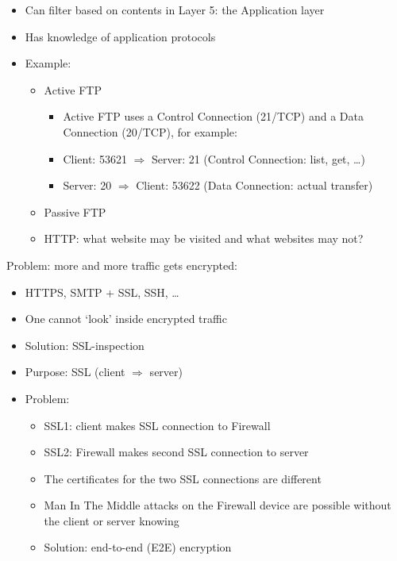 \documentclass{article}
\begin{document}
\begin{itemize}
    \item Can filter based on contents in Layer 5: the Application layer
    \item Has knowledge of application protocols
    \item Example:
    \begin{itemize}
        \item Active FTP
        \begin{itemize}
            \item Active FTP uses a Control Connection (21/TCP) and a Data Connection (20/TCP), for example:
            \item Client: 53621 $\Rightarrow$ Server: 21 (Control Connection: list, get, \dots)
            \item Server: 20 $\Rightarrow$ Client: 53622 (Data Connection: actual transfer)
        \end{itemize}
        \item Passive FTP
        \item HTTP: what website may be visited and what websites may not?
    \end{itemize}
\end{itemize}

Problem: more and more traffic gets encrypted:

\begin{itemize}
    \item HTTPS, SMTP + SSL, SSH, \dots
    \item One cannot `look' inside encrypted traffic
    \item Solution: SSL-inspection
    \item Purpose: SSL (client $\Rightarrow$ server)
    \item Problem:
    \begin{itemize}
        \item SSL1: client makes SSL connection to Firewall
        \item SSL2: Firewall makes second SSL connection to server
        \item The certificates for the two SSL connections are different
        \item Man In The Middle attacks on the Firewall device are possible without the client or server knowing
        \item Solution: end-to-end (E2E) encryption
    \end{itemize}
\end{itemize}
\end{document}
